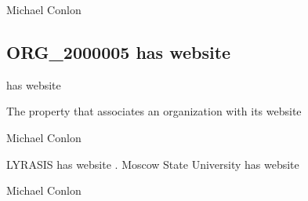 \documentclass[letterpaper,10pt,english]{sphinxmanual}
\begin{document}
\begin{sphinxShadowBox}

\sphinxAtStartPar
Michael Conlon 
\end{sphinxShadowBox}
\begin{quote}

\ignorespaces \end{quote}


\subsection{ORG\_2000005 \sphinxhyphen{} has website}
\label{\detokenize{doc-ORG_2000005:org-2000005-has-website}}\label{\detokenize{doc-ORG_2000005:index-0}}\label{\detokenize{doc-ORG_2000005::doc}}
\begin{sphinxShadowBox}

\sphinxAtStartPar
has website
\end{sphinxShadowBox}

\begin{sphinxShadowBox}

\sphinxAtStartPar
The property that associates an organization with its website
\end{sphinxShadowBox}

\begin{sphinxShadowBox}

\sphinxAtStartPar
Michael Conlon 
\end{sphinxShadowBox}

\begin{sphinxShadowBox}

\sphinxAtStartPar
LYRASIS has website .  Moscow State University has website 
\end{sphinxShadowBox}

\begin{sphinxShadowBox}

\sphinxAtStartPar
Michael Conlon 
\end{sphinxShadowBox}
\begin{quote}

\ignorespaces \end{quote}
\end{document}
